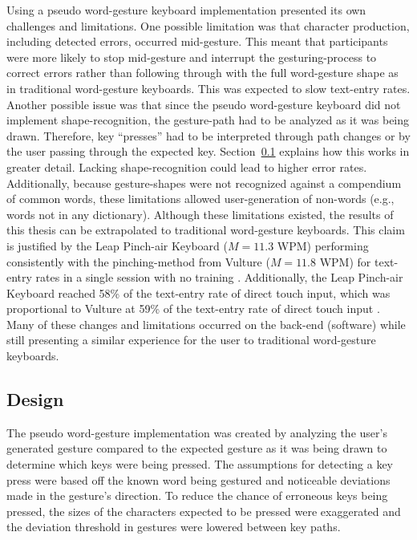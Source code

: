 Using a pseudo word-gesture keyboard implementation presented its own challenges and limitations. One possible limitation was that character production, including detected errors, occurred mid-gesture. This meant that participants were more likely to stop mid-gesture and interrupt the gesturing-process to correct errors rather than following through with the full word-gesture shape as in traditional word-gesture keyboards. This was expected to slow text-entry rates. Another possible issue was that since the pseudo word-gesture keyboard did not implement shape-recognition, the gesture-path had to be analyzed as it was being drawn. Therefore, key ``presses'' had to be interpreted through path changes or by the user passing through the expected key. Section~\ref{design} explains how this works in greater detail. Lacking shape-recognition could lead to higher error rates. Additionally, because gesture-shapes were not recognized against a compendium of common words, these limitations allowed user-generation of non-words (e.g., words not in any dictionary). Although these limitations existed, the results of this thesis can be extrapolated to traditional word-gesture keyboards. This claim is justified by the Leap Pinch-air Keyboard ($M = 11.3$ WPM) performing consistently with the pinching-method from Vulture ($M = 11.8$ WPM) for text-entry rates in a single session with no training \cite{ref_vulture}. Additionally, the Leap Pinch-air Keyboard reached 58\% of the text-entry rate of direct touch input, which was proportional to Vulture at 59\% of the text-entry rate of direct touch input \cite{ref_vulture}. Many of these changes and limitations occurred on the back-end (software) while still presenting a similar experience for the user to traditional word-gesture keyboards.

\subsection{Design} \label{design}
The pseudo word-gesture implementation was created by analyzing the user's generated gesture compared to the expected gesture as it was being drawn to determine which keys were being pressed. The assumptions for detecting a key press were based off the known word being gestured and noticeable deviations made in the gesture's direction. To reduce the chance of erroneous keys being pressed, the sizes of the characters expected to be pressed were exaggerated and the deviation threshold in gestures were lowered between key paths.


